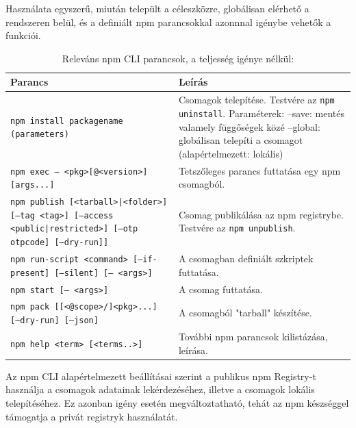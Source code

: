 Használata egyszerű, miután települt a céleszközre, globálisan elérhető a rendszeren belül, és a definiált npm parancsokkal azonnnal igénybe vehetők a funkciói.
\begin{table}[h]
	\caption{Releváns npm CLI parancsok, a teljesség igénye nélkül:}
	\label{tab:npm-cli}
	\begin{tabularx}{\textwidth} { 
			| >{\centering\arraybackslash}X 
			| >{\centering\arraybackslash}X |}
		\hline
		\textbf{Parancs} & \textbf{Leírás} \\
		\hline
		\texttt{npm install packagename (parameters)} & Csomagok telepítése. Testvére az \texttt{npm uninstall}. Paraméterek: 
		\newline--save: mentés valamely függőségek közé
		\newline--global: globálisan telepíti a csomagot (alapértelmezett: lokális)
		\\
		\hline
		\texttt{npm exec -- <pkg>[@<version>] [args...]} & Tetszőleges parancs futtatása egy npm csomagból.
		\\
		\hline
		\texttt{npm publish [<tarball>|<folder>] [--tag <tag>] [--access <public|restricted>] [--otp otpcode] [--dry-run]]} & Csomag publikálása az npm registrybe. Testvére az \texttt{npm unpublish}.
		\\
		\hline
		\texttt{npm run-script <command> [--if-present] [--silent] [-- <args>]} & A csomagban definiált szkriptek futtatása.
		\\
		\hline
		\texttt{npm start [-- <args>]} & A csomag futtatása.
		\\
		\hline
		\texttt{npm pack [[<@scope>/]<pkg>...] [--dry-run] [--json]} & A csomagból "tarball" készítése.
		\\
		\hline
		\texttt{npm help <term> [<terms..>]} & További npm parancsok kilistázása, leírása.
		\\
		\hline
	\end{tabularx}
\end{table}

Az npm CLI alapértelmezett beállításai szerint a publikus npm Registry-t használja a csomagok adatainak lekérdezéséhez, illetve a csomagok lokális telepítéséhez. Ez azonban igény esetén megváltoztatható, tehát az npm készséggel támogatja a privát registryk használatát.

\begin{flushright}
	\cite{npm-cli}
\end{flushright}

